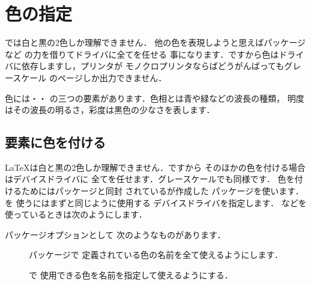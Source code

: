 \section{色の指定\zdash{}}
{\laTEX}では白と黒の2色しか理解できません．
他の色を表現しようと思えばパッケージなど
の力を借りてドライバに全てを任せる
事になります．ですから色はドライバに依存しますし，プリンタが
モノクロプリンタならばどうがんばってもグレースケール
のページしか出力できません．

色には{}・{}・{}
の三つの要素があります．色相とは青や緑などの波長の種類，
明度はその波長の明るさ，彩度は黒色の少なさを表します．


\subsection{要素に色を付ける}
{\LaTeX}は白と黒の2色しか理解できません．ですから
そのほかの色を付ける場合はデバイスドライバに
全てを任せます．グレースケールでも同様です．
色を付けるためにはパッケージと同封
されているが作成した
パッケージを使います．を
使うにはまずと同じように使用する
デバイスドライバを指定します．\prog{\Dvipdfmx}
などを使っているときは次のようにします．

\begin{InTeX}
\usepackage[dvipdfmx]{color} 
\end{InTeX}

パッケージオプションとして
次のようなものがあります．
\begin{description}
 \item[] パッケージで
  定義されている色の名前を全て使えるようにします．
 \item[] で
使用できる色を名前を指定して使えるようにする．
\end{description}

